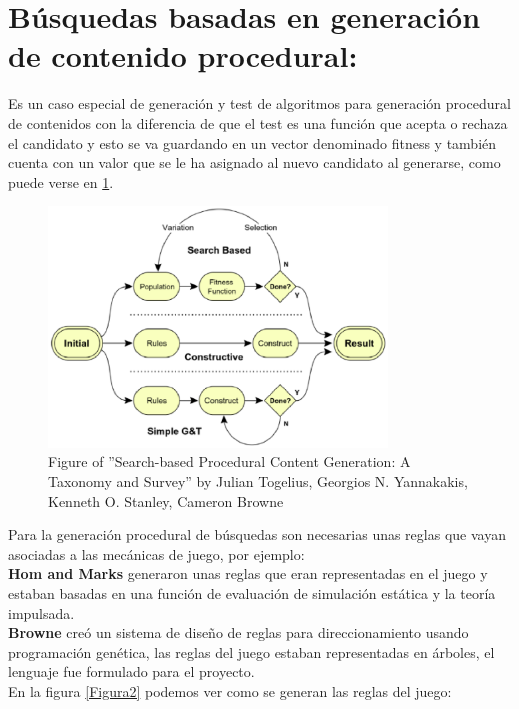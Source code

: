 \section{Búsquedas basadas en generación de contenido procedural:}

Es un caso especial de generación y test de algoritmos para generación procedural de contenidos con la diferencia de que el test es una función que acepta o rechaza el candidato y esto se va guardando en un vector denominado fitness y también cuenta con un valor que se le ha asignado al nuevo candidato  al generarse, como puede verse en \ref{Figura1}.\\

\begin{figure}[hpb]

	\centering
	\includegraphics[width=9cm]{./eps/fig1.eps}
	\caption{Figure of ''Search-based Procedural Content Generation:
	A Taxonomy and Survey'' by
	Julian Togelius, Georgios N. Yannakakis, Kenneth O. Stanley, Cameron Browne}
	\label{Figura1}

\end{figure}

Para la generación procedural de búsquedas son necesarias unas reglas que vayan asociadas a las mecánicas de juego, por ejemplo:\\

{\bf Hom and Marks} generaron unas reglas que eran representadas en el juego y estaban basadas en una función de evaluación de simulación estática y la teoría impulsada.\\

{\bf Browne} creó un sistema de diseño de reglas para direccionamiento usando programación genética, las reglas del juego estaban representadas en árboles, el lenguaje fue formulado para el proyecto.\\

En la figura \ref{Figura2} podemos ver como se generan las reglas del juego:\\

